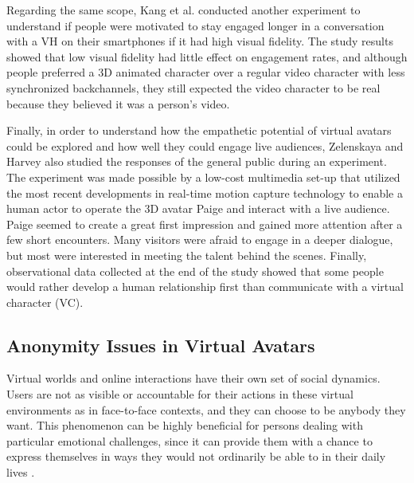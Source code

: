 Regarding the same scope, Kang et al. \cite{KAN16A} conducted another experiment to understand if people were motivated to stay engaged longer in a conversation with a VH on their smartphones if it had high visual fidelity. The study results showed that low visual fidelity had little effect on engagement rates, and although people preferred a 3D animated character over a regular video character with less synchronized backchannels, they still expected the video character to be real because they believed it was a person's video.

Finally, in order to understand how the empathetic potential of virtual avatars could be explored and how well they could engage live audiences, Zelenskaya and Harvey \cite{ZEL19} also studied the responses of the general public during an experiment. The experiment was made possible by a low-cost multimedia set-up that utilized the most recent developments in real-time motion capture technology to enable a human actor to operate the 3D avatar Paige and interact with a live audience. Paige seemed to create a great first impression and gained more attention after a few short encounters. Many visitors were afraid to engage in a deeper dialogue, but most were interested in meeting the talent behind the scenes. Finally, observational data collected at the end of the study showed that some people would rather develop a human relationship first than communicate with a virtual character (VC).

\subsection{Anonymity Issues in Virtual Avatars}
Virtual worlds and online interactions have their own set of social dynamics. Users are not as visible or accountable for their actions in these virtual environments as in face-to-face contexts, and they can choose to be anybody they want. This phenomenon can be highly beneficial for persons dealing with particular emotional challenges, since it can provide them with a chance to express themselves in ways they would not ordinarily be able to in their daily lives \cite{LUC14, ROT19, BAT14}.

